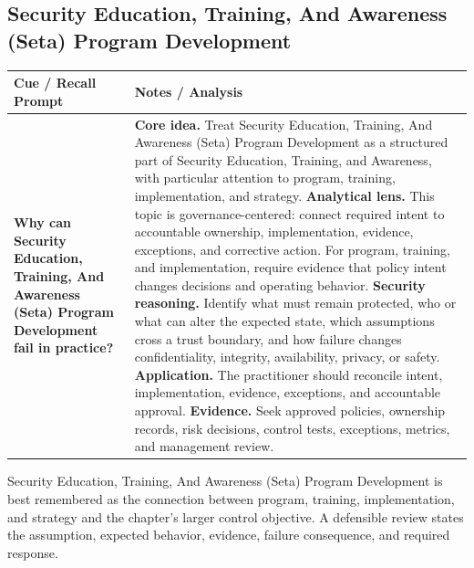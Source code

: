 \documentclass[11pt]{article}
\newcommand{\CornellHeader}{%
\rowcolor{Navy}\color{white}\bfseries Cue / Recall Prompt & \color{white}\bfseries Notes / Analysis\\\hline}
\newcommand{\CornellRow}[2]{%
\cellcolor{CueGray}\RaggedRight\textbf{#1} & \RaggedRight #2\\\hline}
\begin{document}
\subsection*{Security Education, Training, And Awareness (Seta) Program Development}
\begin{longtable}{>{\RaggedRight\arraybackslash}p{}|>{\RaggedRight\arraybackslash}p{}}
\CornellHeader
\CornellRow{Why can Security Education, Training, And Awareness (Seta) Program Development fail in practice?}{\textbf{Core idea.} Treat Security Education, Training, And Awareness (Seta) Program Development as a structured part of Security Education, Training, and Awareness, with particular attention to program, training, implementation, and strategy. \textbf{Analytical lens.} This topic is governance-centered: connect required intent to accountable ownership, implementation, evidence, exceptions, and corrective action. For program, training, and implementation, require evidence that policy intent changes decisions and operating behavior. \textbf{Security reasoning.} Identify what must remain protected, who or what can alter the expected state, which assumptions cross a trust boundary, and how failure changes confidentiality, integrity, availability, privacy, or safety. \textbf{Application.} The practitioner should reconcile intent, implementation, evidence, exceptions, and accountable approval. \textbf{Evidence.} Seek approved policies, ownership records, risk decisions, control tests, exceptions, metrics, and management review.}
\end{longtable}
\begin{topicsummary}
Security Education, Training, And Awareness (Seta) Program Development is best remembered as the connection between program, training, implementation, and strategy and the chapter's larger control objective. A defensible review states the assumption, expected behavior, evidence, failure consequence, and required response.
\end{topicsummary}
\end{document}
